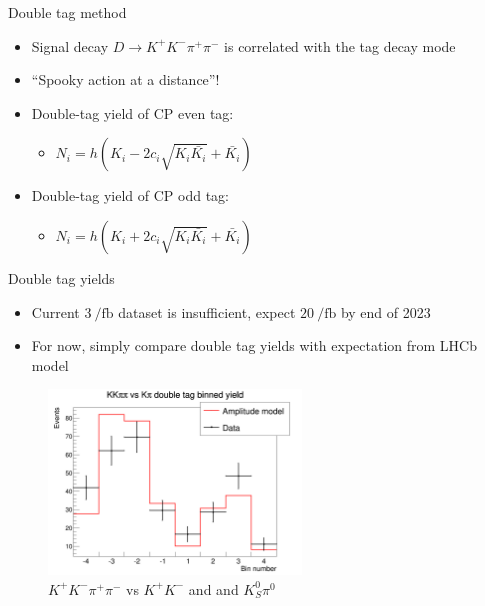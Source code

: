 \documentclass{beamer}
\begin{document}
\begin{frame}{Double tag method}
  \begin{itemize}
    \setlength\itemsep{1.5em}
    \item{Signal decay $D\to K^+K^-\pi^+\pi^-$ is correlated with the tag decay mode}
    \item{``Spooky action at a distance''!}
    \item{Double-tag yield of CP even tag:}
    \begin{itemize}
      \item{$N_i = h(K_i - 2c_i\sqrt{K_i\bar{K_i}} + \bar{K_i})$}
    \end{itemize}
    \item{Double-tag yield of CP odd tag:}
    \begin{itemize}
      \item{$N_i = h(K_i + 2c_i\sqrt{K_i\bar{K_i}} + \bar{K_i})$}
    \end{itemize}
  \end{itemize}
\end{frame}

\begin{frame}{Double tag yields}
  \begin{itemize}
    \setlength\itemsep{1.3em}
    \item{Current $\SI{3}{\per\femto\barn}$ dataset is insufficient, expect $\SI{20}{\per\femto\barn}$ by end of 2023}
    \item{For now, simply compare double tag yields with expectation from LHCb model}
  \end{itemize}
  \begin{figure}
    \centering
    \includegraphics[width = 0.6\textwidth]{../Report/Plots/DoubleTagYieldFlavour.png}
    \caption{$K^+K^-\pi^+\pi^-$ vs $K^+K^-$ and and $K_S^0\pi^0$}
  \end{figure}
\end{frame}
\end{document}
